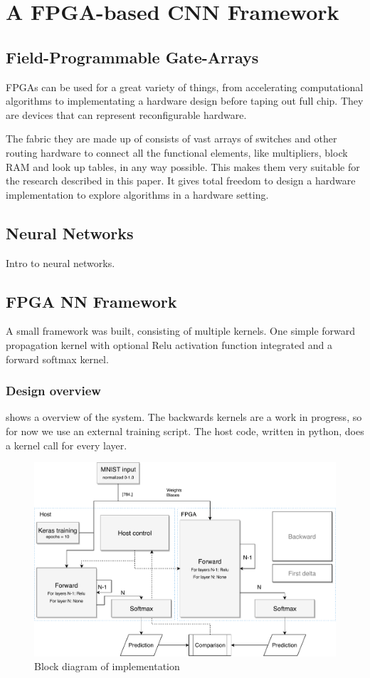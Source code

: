 \documentclass[techrep,english]{ipsj} %
\begin{document}
\section{A FPGA-based CNN Framework}\label{sec:framework}
\subsection{Field-Programmable Gate-Arrays}
FPGAs can be used for a great variety of things, from accelerating computational algorithms to implementating a hardware design before taping out full chip.
They are devices that can represent reconfigurable hardware.

The fabric they are made up of consists of vast arrays of switches and other routing hardware to connect all the functional elements, like multipliers, block RAM and look up tables, in any way possible.
This makes them very suitable for the research described in this paper.
It gives total freedom to design a hardware implementation to explore algorithms in a hardware setting.

\subsection{Neural Networks}
Intro to neural networks.

\subsection{FPGA NN Framework}
A small framework was built, consisting of multiple kernels.
One simple forward propagation kernel with optional Relu activation function integrated and a forward softmax kernel.
\subsubsection{Design overview}
 shows a overview of the system.
The backwards kernels are a work in progress, so for now we use an external training script.
The host code, written in python, does a kernel call for every layer.

\begin{figure}[ht]
  \centering
  \includegraphics[width=\linewidth]{block-diagram.pdf}
  \caption{Block diagram of implementation}\label{fig:block-diagram}
\end{figure}
\end{document}
